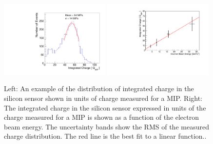 \documentclass[preprint,1p]{elsarticle}
\begin{document}
\begin{figure}[htbp] 
\centering
\includegraphics[width=0.49\textwidth]{plots/Electron_6X0_32GeV_chargeMIP.pdf} 
\includegraphics[width=0.49\textwidth]{plots/MIPVsEnergyAt6X0.pdf} 
\caption{ Left: An example of the distribution of integrated charge in the
silicon sensor shown in units of charge measured for a MIP. Right: The
integrated charge in the silicon sensor expressed in units of the charge
measured for a MIP is shown as a function of the electron beam energy. The
uncertainty bands show the RMS of the measured charge distribution. The red line
is the best fit to a linear function..} 
\label{fig:ChargeDistributionExample}
\end{figure}
\end{document}
